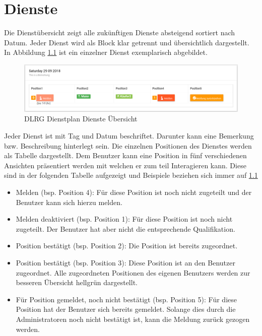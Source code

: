 \chapter{Dienste}
\label{cha:dienste}
Die Dienstübersicht zeigt alle zukünftigen Dienste absteigend sortiert nach Datum. Jeder Dienst wird als Block klar getrennt und übersichtlich dargestellt. In Abbildung \ref{fig:view_service} \textit{} ist ein einzelner Dienst exemplarisch abgebildet.

\begin{figure}[h]
 \begin{addmargin}{-0.2\linewidth}
   \centering 
   \includegraphics[width=20cm]{Bilder/view_service.png}
 \end{addmargin} 
 \caption[Dienste Übersicht]{DLRG Dienstplan Dienste Übersicht}
 \label{fig:view_service}
\end{figure}

\noindent Jeder Dienst ist mit Tag und Datum beschriftet. Darunter kann eine Bemerkung bzw. Beschreibung hinterlegt sein. Die einzelnen Positionen des Dienstes werden als Tabelle dargestellt.
\noindent Dem Benutzer kann eine Position in fünf verschiedenen Ansichten präsentiert werden mit welchen er zum teil Interagieren kann.
Diese sind in der folgenden Tabelle aufgezeigt und Beispiele beziehen sich immer auf \ref{fig:view_service} \textit{}

\begin{itemize}
\item Melden (bsp. Position 4): Für diese Position ist noch nicht zugeteilt und der Benutzer kann sich hierzu melden.
\item Melden deaktiviert (bsp. Position 1): Für diese Position ist noch nicht zugeteilt. Der Benutzer hat aber nicht die entsprechende Qualifikation.
\item Position bestätigt (bsp. Position 2): Die Position ist bereits zugeordnet.
\item Position bestätigt (bsp. Position 3): Diese Position ist an den Benutzer zugeordnet. Alle zugeordneten Positionen des eigenen Benutzers werden zur besseren Übersicht hellgrün dargestellt.
\item Für Position gemeldet, noch nicht bestätigt (bsp. Position 5): Für diese Position hat der Benutzer sich bereits gemeldet. Solange dies durch die Administratoren noch nicht bestätigt ist, kann die Meldung zurück gezogen werden.
\end{itemize}

